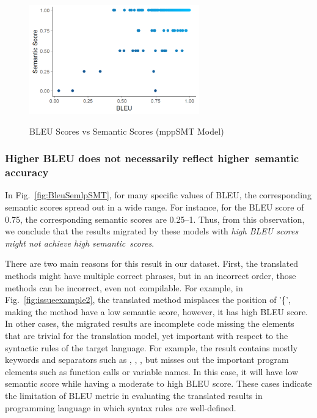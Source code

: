 \begin{figure}
\caption{BLEU Scores vs Semantic Scores (mppSMT Model)}
\centering
\includegraphics[width=2.9in]{img/bleuvssemantic_mppSMT.png}
\label{fig:BleuSemMppSMT}
\end{figure}

\subsubsection{{\bf Higher BLEU does not necessarily reflect higher~semantic accuracy}}

In Fig.~\ref{fig:BleuSemlpSMT}, for many specific values of BLEU, the
corresponding semantic scores spread out in a wide range. For
instance, for the BLEU score of 0.75, the corresponding semantic scores
are 0.25--1.
Thus, from this observation, we conclude that the results migrated by
these models with {\em high BLEU scores might not achieve high
  semantic~scores}.
%

There are two main reasons for this result in our dataset.  First, the
translated methods might have multiple correct phrases, but in an
incorrect order, those methods can be incorrect, even not compilable.
%
For example, in Fig.~\ref{fig:issueexample2}, the translated method
misplaces the position of '\{', making the method have a low
semantic score, however, it has high BLEU score.
%
In other cases, the migrated results are incomplete code missing the
elements that are trivial for the translation model, yet important
with respect to the syntactic rules of the target language. For
example, the result contains mostly keywords and separators such as
, , \code{()}, but misses out the important
program elements such as function calls or variable names. In this
case, it will have low semantic score while having a moderate to high
BLEU score. These cases indicate the limitation of BLEU metric
in evaluating the translated results in programming language in which
syntax rules are well-defined.



